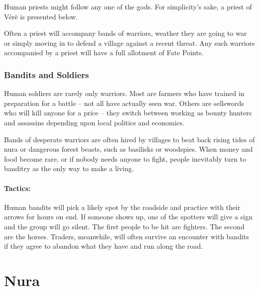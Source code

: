 \begin{multicols}{2}

\label{human_priest}

Human priests might follow any one of the gods.
For simplicity's sake, a priest of V\'{e}r\"{e} is presented below.


Often a priest will accompany bands of warriors, weather they are going to war or simply moving in to defend a village against a recent threat.
Any such warriors accompanied by a priest will have a full allotment of Fate Points.

\subsubsection{Bandits and Soldiers}\label{human_soldier}

Human soldiers are rarely only warriors.
Most are farmers who have trained in preparation for a battle -- not all have actually seen war.
Others are sellswords who will kill anyone for a price -- they switch between working as bounty hunters and assassins depending upon local politics and economics.

Bands of desperate warriors are often hired by villages to beat back rising tides of nura or dangerous forest beasts, such as basilisks or woodspies.
When money and food become rare, or if nobody needs anyone to fight, people inevitably turn to banditry as the only way to make a living.

\paragraph{Tactics:} Human bandits will pick a likely spot by the roadside and practice with their arrows for hours on end.
If someone shows up, one of the spotters will give a sign and the group will go silent.
The first people to be hit are fighters.
The second are the horses.
Traders, meanwhile, will often survive an encounter with bandits if they agree to abandon what they have and run along the road.



\vfill\null
\end{multicols}

\section{Nura}

